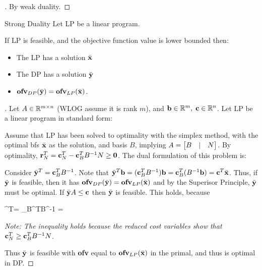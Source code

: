 \begin{proof}[]
By weak duality.
\end{proof}

\begin{theo}{Strong Duality}{}
Let LP be a linear program.

\medskip
If LP is feasible, and the objective 
function value is lower bounded then:
\begin{itemize}
	\item The LP has a solution $\bar{\mathbf{x}}$
	\item The DP has a solution $\bar{\mathbf{y}}$
	\item $\textbf{ofv}_{DP}(\bar{\mathbf{y}})=\textbf{ofv}_{LP}(\bar{\mathbf{x}})$.
\end{itemize}
\end{theo}

\begin{proof}[]
Let $A \in \mathbb{R}^{m \times n}$ (WLOG assume it is rank $m$),
and $\mathbf{b} \in \mathbb{R}^m, \; \mathbf{c} \in \mathbb{R}^n$. Let LP be a linear program in
standard form:
Assume that LP has been solved to optimality with the simplex method, with the
optimal bfs $\bar{\mathbf{x}}$ as the solution, and basis
$B$, implying
$A = \begin{bmatrix} B & | & N \end{bmatrix}$.
By optimality, $\mathbf{r}_N^T = \mathbf{c}_N^T - \mathbf{c}_B^TB^{-1}N \geq \mathbf{0}$.
The dual formulation of this problem is:
Consider $\bar{\mathbf{y}}^T = \mathbf{c}_B^TB^{-1}$. Note that 
$\bar{\mathbf{y}}^T\mathbf{b} = (\mathbf{c}_B^TB^{-1})\mathbf{b} = \mathbf{c}_B^T(B^{-1}\mathbf{b}) = \mathbf{c}^T\bar{\mathbf{x}}$. Thus, if
$\bar{\mathbf{y}}$ is feasible, then it has $\textbf{ofv}_{DP}(\bar{\mathbf{y}}) = \textbf{ofv}_{LP}(\bar{\mathbf{x}})$ 
and by the Superisor Principle, $\bar{\mathbf{y}}$ must be optimal.
If $\bar{\mathbf{y}}A \leq \mathbf{c}$ then $\bar{\mathbf{y}}$ is feasible. This holds, because
\begin{frml}
	\by^T\vA = \vc_B^TB^{-1} = 
	\leq {}
\end{frml}

\textit{Note: The inequality holds because the reduced cost variables show 
that $\mathbf{c}_N^T \geq \mathbf{c}_B^TB^{-1}N$.}

Thus $\bar{\mathbf{y}}$ is feasible with \textbf{ofv} equal to $\textbf{ofv}_{LP}(\bar{\mathbf{x}})$ 
in the primal, and thus is optimal in DP.
\end{proof}

